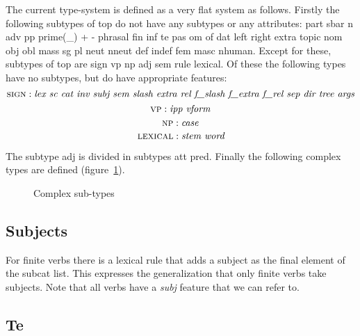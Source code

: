 The current type-system is defined as a very flat system as follows.
Firstly the following subtypes of {\sc top} do not have any subtypes
or any attributes: 
{\sc part sbar n adv pp
prime(\_) + - phrasal fin inf te
pas om of dat left right extra topic nom obj obl mass sg pl neut nneut 
def indef fem masc nhuman}.  
Except for these, subtypes of {\sc top} are {\sc sign vp np adj sem rule lexical}.
Of these the following types have no subtypes, but do have appropriate
features:
\[ \mbox{\sc sign} : \mbox{\it lex sc cat inv subj sem slash extra rel f\_slash f\_extra f\_rel sep dir tree args} \]
\[  \mbox{\sc vp} : \mbox{\it ipp vform}\]
\[  \mbox{\sc np} : \mbox{\it case}\]
\[  \mbox{\sc lexical} : \mbox{\it stem word}\]

The subtype {\sc adj} is divided in subtypes {\sc att pred}.
Finally the following complex types are defined (figure~\ref{fig3}).

\begin{figure}[h,t,b,p]

\caption{\label{fig3}Complex sub-types}
\end{figure}

\nodeskip{30pt}
\endtree
\endtree
\endtree
\endtree

\nodeskip{40pt}
\endtree
\subsection{Subjects}

For finite verbs there is a lexical rule that adds a subject as the
final element of the subcat list. This expresses the generalization
that only finite verbs take subjects. Note that all verbs have a
{\it subj} feature that we can refer to.

\subsection{Te}

